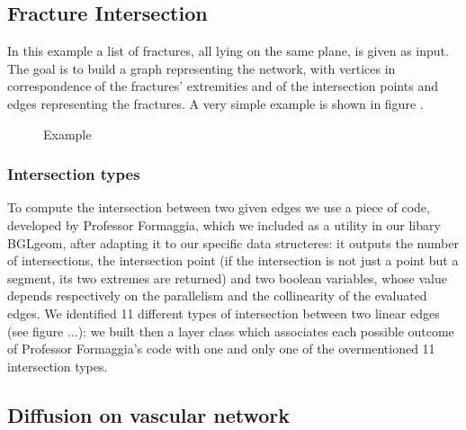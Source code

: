 \documentclass[11pt]{article} %
\begin{document}
	\subsection{Fracture Intersection}
	In this example a list of fractures, all lying on the same plane, is given as input. The goal is to build a graph representing the network, with vertices in correspondence of the fractures' extremities and of the intersection points  and edges representing the fractures. A very simple example is shown in figure \label{fig:frac_int}.
	\begin{figure}
		\centering 
		\caption{Example}
		\label{fig:frac_int}
	\end{figure}
	
		\subsubsection{Intersection types}
		To compute the intersection between two given edges we use a piece of code, developed by Professor Formaggia, which we included as a utility in our libary BGLgeom, after adapting it to our specific data structeres: it outputs the number of intersections, the intersection point (if the intersection is not just a point but a segment, its two extremes are returned) and two boolean variables, whose value depends respectively on the parallelism and the collinearity of the evaluated edges. \newline
		We identified 11 different types of intersection between two linear edges (see figure ...): we built then a layer class which associates each possible outcome of Professor Formaggia's code with one and only one of the overmentioned 11 intersection types. \newline
			
		



	\subsection{Diffusion on vascular network}

\end{document}
